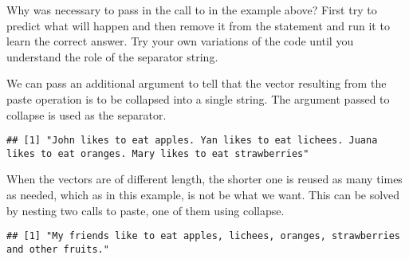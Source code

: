 \documentclass[krantz2]{krantz}\usepackage{knitr}
\begin{document}
\begin{playground}
 Why was necessary to pass  in the call to  in the example above? First try to predict what will happen and then remove it from the statement and run it to learn the correct answer. Try your own variations of the code until you understand the role of the separator string.
\end{playground}

We can pass an additional argument to tell that the vector resulting from the paste operation is to be collapsed into a single  string. The argument passed to collapse is used as the separator.

\begin{knitrout}\footnotesize
{}\color{fgcolor}\begin{kframe}
\begin{alltt}
   \hlstd{=} \hlstd{)}
\end{alltt}
\begin{verbatim}
## [1] "John likes to eat apples. Yan likes to eat lichees. Juana likes to eat oranges. Mary likes to eat strawberries"
\end{verbatim}
\end{kframe}
\end{knitrout}

When the vectors are of different length, the shorter one is reused as many times as needed, which as in this example, is not be what we want. This can be solved by nesting two calls to paste, one of them using collapse.

\begin{knitrout}\footnotesize
{}\color{fgcolor}\begin{kframe}
\begin{alltt}
\hlstd{(}\hlstd{,}   \hlstd{=} \hlstd{),} \hlstd{)}
\end{alltt}
\begin{verbatim}
## [1] "My friends like to eat apples, lichees, oranges, strawberries and other fruits."
\end{verbatim}
\end{kframe}
\end{knitrout}
\end{document}
